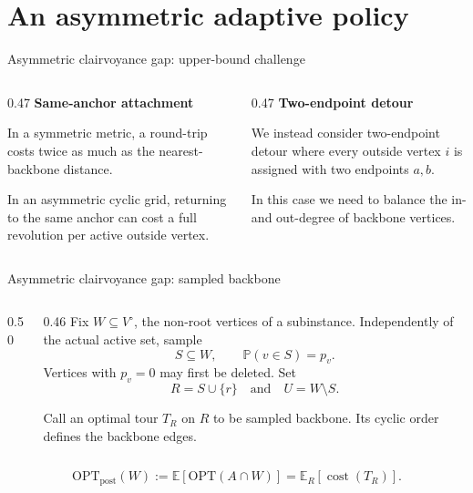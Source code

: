 \documentclass[aspectratio=169,12pt]{beamer}
\newcommand{\OPT}{\mathrm{OPT}}
\newcommand{\optpost}{\OPT_{\mathrm{post}}}
\newcommand{\E}{\mathbb{E}}
\newcommand{\Pp}{\mathbb{P}}
\newcommand{\cost}{\operatorname{cost}}
\begin{document}
\section{An asymmetric adaptive policy}

\begin{frame}{Asymmetric clairvoyance gap: upper-bound challenge}
  \begin{columns}[T,onlytextwidth]
    \begin{column}{0.47\textwidth}
      \centering
      {\small\bfseries\color{ThCoral}Same-anchor attachment}\par
      \smallskip
      \resizebox{0.88\linewidth}{!}{\ThSameAnchorAttachment}

      \medskip
      \raggedright
      In a symmetric metric, a round-trip costs twice as much as
      the nearest-backbone distance.

      \smallskip
      In an asymmetric cyclic grid, returning to the same anchor can cost
      a full revolution per active outside vertex.
    \end{column}
    \begin{column}{0.47\textwidth}
      \centering
      {\small\bfseries\color{ThTeal}Two-endpoint detour}\par
      \smallskip
      \resizebox{0.88\linewidth}{!}{\ThTwoEndpointDetour}
      \medskip

      We instead consider two-endpoint detour where every outside vertex $i$ is
      assigned with two endpoints $a, b$.

      \smallskip
      In this case we need to balance the in- and out-degree of backbone vertices.
      \raggedright
    \end{column}
  \end{columns}
\end{frame}

\begin{frame}{Asymmetric clairvoyance gap: sampled backbone}
  \begin{columns}[c,onlytextwidth]
    \begin{column}{0.50\textwidth}
      \centering
      \resizebox{0.82\linewidth}{!}{\ThSampledBackboneCycle}
    \end{column}
    \begin{column}{0.46\textwidth}
      \small
      Fix \(W\subseteq V^\circ\), the non-root vertices of a subinstance.
      Independently of the actual active set, sample
      \[
        S\subseteq W,\qquad \Pp(v\in S)=p_v.
      \]
      Vertices with \(p_v=0\) may first be deleted. Set
      \[
        R=S\cup\{r\}\quad\text{and}\quad U=W\setminus S.
      \]

      Call an optimal tour \(T_R\) on \(R\) to be sampled backbone. Its cyclic
      order defines the backbone edges.
    \end{column}
  \end{columns}

  \centering
  \[
    \optpost(W):=\E[\OPT(A\cap W)]
    =\E_R[\cost(T_R)].
  \]
\end{frame}
\end{document}
